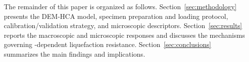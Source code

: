 The remainder of this paper is organized as follows. Section~\ref{sec:methodology} presents the DEM-HCA model, specimen preparation and loading protocol, calibration/validation strategy, and microscopic descriptors. Section~\ref{sec:results} reports the macroscopic and microscopic responses and discusses the mechanisms governing \Kzero{}-dependent liquefaction resistance. Section~\ref{sec:conclusions} summarizes the main findings and implications.
